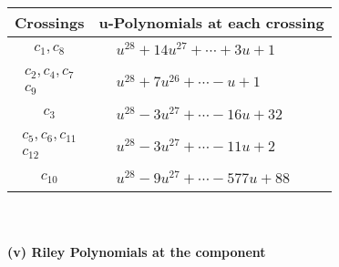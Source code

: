 \documentclass[1p]{elsarticle_modified}
\theoremstyle{definition}
\begin{document}
\begin{tabular}{m{50pt}|m{274pt}}
Crossings & \hspace{64pt}u-Polynomials at each crossing \\
\hline $$\begin{aligned}c_{1},c_{8}\end{aligned}$$&$\begin{aligned}
&u^{28}+14 u^{27}+\cdots+3 u+1
\end{aligned}$\\
\hline $$\begin{aligned}c_{2},c_{4},c_{7}\\c_{9}\end{aligned}$$&$\begin{aligned}
&u^{28}+7 u^{26}+\cdots- u+1
\end{aligned}$\\
\hline $$\begin{aligned}c_{3}\end{aligned}$$&$\begin{aligned}
&u^{28}-3 u^{27}+\cdots-16 u+32
\end{aligned}$\\
\hline $$\begin{aligned}c_{5},c_{6},c_{11}\\c_{12}\end{aligned}$$&$\begin{aligned}
&u^{28}-3 u^{27}+\cdots-11 u+2
\end{aligned}$\\
\hline $$\begin{aligned}c_{10}\end{aligned}$$&$\begin{aligned}
&u^{28}-9 u^{27}+\cdots-577 u+88
\end{aligned}$\\
\hline
\end{tabular}\\~\\
\newpage\renewcommand{\arraystretch}{1}
\flushleft \textbf{(v) Riley Polynomials at the component}\newline \\
\end{document}

